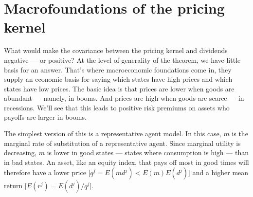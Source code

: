 \documentclass[11pt]{article}
\begin{document}
\section{Macrofoundations of the pricing kernel}

What would make the covariance between the pricing kernel and dividends negative --- or positive?
At the level of generality of the theorem, we have little basis for an answer.
That's where macroeconomic foundations come in, they supply an economic basis
for saying which states have high prices
and which states have low prices.
The basic idea is that prices are lower when goods are abundant ---
namely, in booms.
And prices are high when goods are scarce --- in recessions.
We'll see that this leads to positive risk premiums on assets who payoffs are
larger in booms.

The simplest version of this is a representative agent model.
In this case, $m$ is the marginal rate of substitution of a representative agent.
Since marginal utility is decreasing, $m$ is lower in
good states --- states where consumption is high ---
than in bad states.
An asset, like an equity index, that pays off most in good times
will therefore have a lower price [$q^j = E(md^j) < E(m) E(d^j)$]
and a higher mean return [$E(r^j) = E(d^j)/q^j$].
\end{document}
